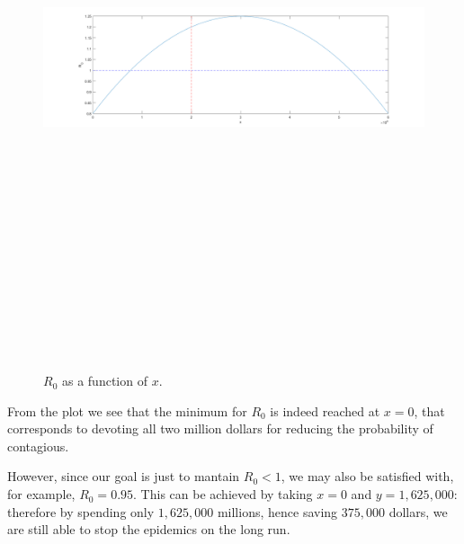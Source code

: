 \documentclass{report}
\theoremstyle{definition}
\theoremstyle{remark}
\begin{document}
\begin{figure} [h]
	\centering
	\includegraphics [width=12cm,height=17cm,keepaspectratio]{parabola.png}
	\label{Par}
	\caption{$R_0$ as a function of $x$.}
\end{figure}


From the plot we see that the minimum for $R_0$ is indeed reached at $x = 0$, that corresponds to devoting all two million dollars for reducing the probability of contagious.

However, since our goal is just to mantain $R_0<1$, we may also be satisfied with, for example, $R_0 = 0.95$. This can be achieved  by taking $x = 0$ and $y = 1,625,000$: therefore by spending only $1,625,000$ millions, hence saving $375,000$ dollars, we are still able to stop the epidemics on the long run.
\end{document}
